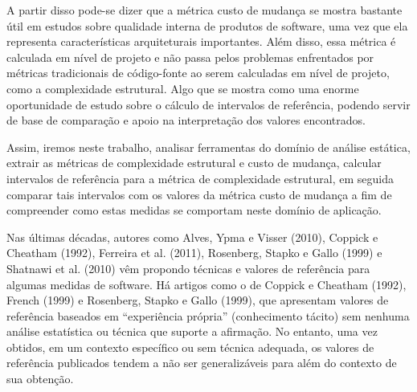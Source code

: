 A partir disso pode-se dizer que a métrica custo de mudança se mostra bastante
útil em estudos sobre qualidade interna de produtos de software, uma vez que
ela representa características arquiteturais importantes. Além disso, essa
métrica é calculada em nível de projeto e não passa pelos problemas enfrentados
por métricas tradicionais de código-fonte ao serem calculadas em nível de
projeto, como a complexidade estrutural.  Algo que se mostra como uma enorme
oportunidade de estudo sobre o cálculo de intervalos de referência, podendo
servir de base de comparação e apoio na interpretação dos valores encontrados.

Assim, iremos neste trabalho, analisar ferramentas do domínio de análise
estática, extrair as métricas de complexidade estrutural e custo de mudança,
calcular intervalos de referência para a métrica de complexidade estrutural, em
seguida comparar tais intervalos com os valores da métrica custo de mudança a
fim de compreender como estas medidas se comportam neste domínio de aplicação.

%
%
%

\cite{Lima2014}

Nas últimas décadas, autores como Alves, Ypma e Visser (2010),
Coppick e Cheatham (1992), Ferreira et al. (2011), Rosenberg, Stapko e Gallo
(1999) e Shatnawi et al. (2010) vêm propondo técnicas e valores de referência
para algumas medidas de software. Há artigos como o de Coppick e Cheatham
(1992), French (1999) e Rosenberg, Stapko e Gallo (1999), que apresentam
valores de referência baseados em “experiência própria” (conhecimento tácito)
sem nenhuma análise estatística ou técnica que suporte a afirmação. No entanto,
uma vez obtidos, em um contexto específico ou sem técnica adequada, os
valores de referência publicados tendem a não ser generalizáveis para além do
contexto de sua obtenção.

